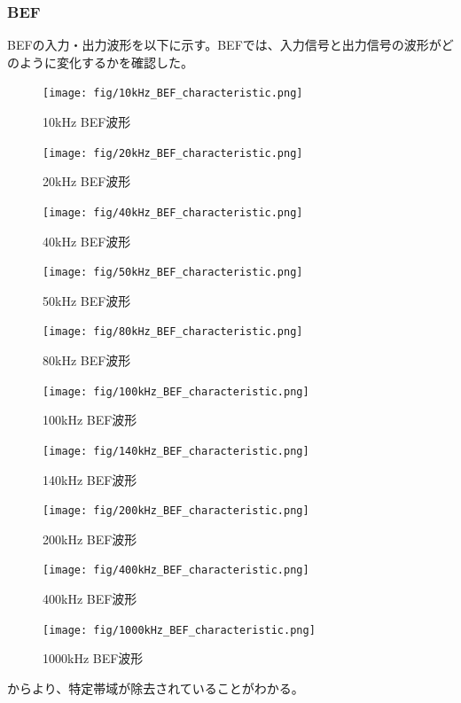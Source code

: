 \documentclass[11pt,dvipdfmx]{jarticle}
\begin{document}
\subsubsection{BEF}
BEFの入力・出力波形を以下に示す。BEFでは、入力信号と出力信号の波形がどのように変化するかを確認した。
\begin{figure}[H]
  \centering
  \texttt{[image: fig/10kHz\_BEF\_characteristic.png]}
  \caption{10kHz BEF波形}
  \label{fig:10kHz_BEF}
\end{figure}
\begin{figure}[H]
  \centering
  \texttt{[image: fig/20kHz\_BEF\_characteristic.png]}
  \caption{20kHz BEF波形}
  \label{fig:20kHz_BEF}
\end{figure}
\begin{figure}[H]
  \centering
  \texttt{[image: fig/40kHz\_BEF\_characteristic.png]}
  \caption{40kHz BEF波形}
  \label{fig:40kHz_BEF}
\end{figure}
\begin{figure}[H]
  \centering
  \texttt{[image: fig/50kHz\_BEF\_characteristic.png]}
  \caption{50kHz BEF波形}
  \label{fig:50kHz_BEF}
\end{figure}
\begin{figure}[H]
  \centering
  \texttt{[image: fig/80kHz\_BEF\_characteristic.png]}
  \caption{80kHz BEF波形}
  \label{fig:80kHz_BEF}
\end{figure}
\begin{figure}[H]
  \centering
  \texttt{[image: fig/100kHz\_BEF\_characteristic.png]}
  \caption{100kHz BEF波形}
  \label{fig:100kHz_BEF}
\end{figure}
\begin{figure}[H]
  \centering
  \texttt{[image: fig/140kHz\_BEF\_characteristic.png]}
  \caption{140kHz BEF波形}
  \label{fig:140kHz_BEF}
\end{figure}
\begin{figure}[H]
  \centering
  \texttt{[image: fig/200kHz\_BEF\_characteristic.png]}
  \caption{200kHz BEF波形}
  \label{fig:200kHz_BEF}
\end{figure}
\begin{figure}[H]
  \centering
  \texttt{[image: fig/400kHz\_BEF\_characteristic.png]}
  \caption{400kHz BEF波形}
  \label{fig:400kHz_BEF}
\end{figure}
\begin{figure}[H]
  \centering
  \texttt{[image: fig/1000kHz\_BEF\_characteristic.png]}
  \caption{1000kHz BEF波形}
  \label{fig:1000kHz_BEF}
\end{figure}
からより、特定帯域が除去されていることがわかる。
\end{document}
